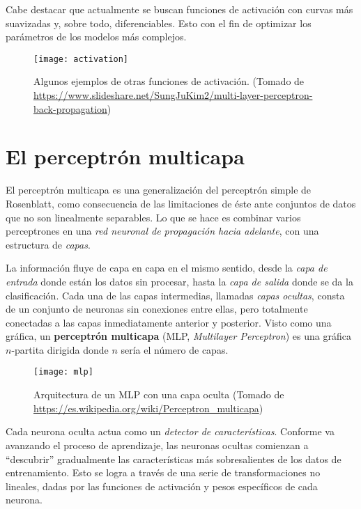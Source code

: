 Cabe destacar que actualmente se buscan funciones de activación con
curvas más suavizadas y, sobre todo, diferenciables. Esto con el fin
de optimizar los parámetros de los modelos más complejos.

\begin{center}
\begin{figure}[H]
  \texttt{[image: activation]} \centering
  \caption{Algunos ejemplos de otras funciones de activación.  (Tomado
    de
    \url{https://www.slideshare.net/SungJuKim2/multi-layer-perceptron-back-propagation})}
\end{figure}
\end{center}

\section{El perceptrón multicapa}
El perceptrón multicapa es una generalización del perceptrón simple de
Rosenblatt, como consecuencia de las limitaciones de éste ante
conjuntos de datos que no son linealmente separables. Lo que se hace
es combinar varios perceptrones en una \textit{red neuronal de
  propagación hacia adelante}, con una estructura de \textit{capas}.

La información fluye de capa en capa en el mismo sentido, desde la
\textit{capa de entrada} donde están los datos sin procesar, hasta la
\textit{capa de salida} donde se da la clasificación. Cada una de las capas
intermedias, llamadas \textit{capas ocultas}, consta de un conjunto de
neuronas sin conexiones entre ellas, pero totalmente conectadas a las
capas inmediatamente anterior y posterior. Visto como una gráfica, un
\textbf{perceptrón multicapa} (MLP, \textit{Multilayer Perceptron})
es una gráfica $n$-partita dirigida donde $n$ sería el número de
capas.
\begin{figure}[H]
  \texttt{[image: mlp]} \centering \caption{Arquitectura de
  un MLP con una capa oculta (Tomado de \url{https://es.wikipedia.org/wiki/Perceptron_multicapa})}
\end{figure}
Cada neurona oculta actua como un \textit{detector de
  características}. Conforme va avanzando el proceso de aprendizaje,
las neuronas ocultas comienzan a ``descubrir'' gradualmente las
características más sobresalientes de los datos de entrenamiento.
Esto se logra a través de una serie de transformaciones no lineales,
dadas por las funciones de activación y pesos específicos de cada
neurona.

